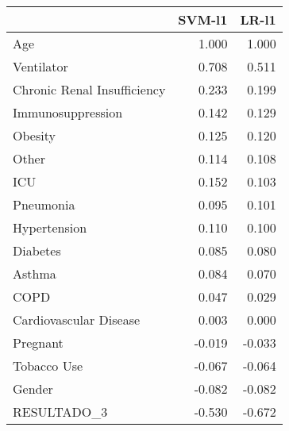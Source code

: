 \begin{tabular}{lrr}
\toprule
{} &  SVM-l1 &  LR-l1 \\
\midrule
Age                         &   1.000 &  1.000 \\
Ventilator                  &   0.708 &  0.511 \\
Chronic Renal Insufficiency &   0.233 &  0.199 \\
Immunosuppression           &   0.142 &  0.129 \\
Obesity                     &   0.125 &  0.120 \\
Other                       &   0.114 &  0.108 \\
ICU                         &   0.152 &  0.103 \\
Pneumonia                   &   0.095 &  0.101 \\
Hypertension                &   0.110 &  0.100 \\
Diabetes                    &   0.085 &  0.080 \\
Asthma                      &   0.084 &  0.070 \\
COPD                        &   0.047 &  0.029 \\
Cardiovascular Disease      &   0.003 &  0.000 \\
Pregnant                    &  -0.019 & -0.033 \\
Tobacco Use                 &  -0.067 & -0.064 \\
Gender                      &  -0.082 & -0.082 \\
RESULTADO\_3                 &  -0.530 & -0.672 \\
\bottomrule
\end{tabular}
